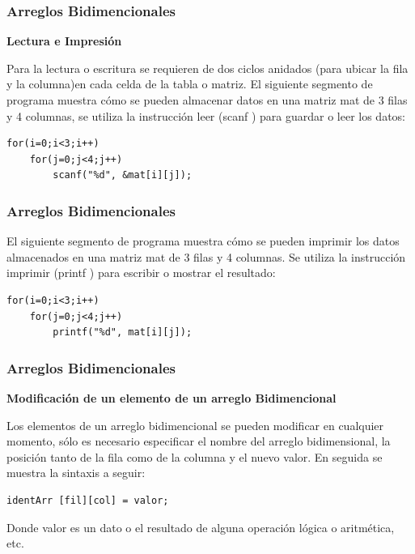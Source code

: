 \begin{frame}[t, fragile]
    \frametitle{Arreglos Bidimencionales}
    \begin{center}\textbf{Lectura e Impresión}\end{center}
    \justify
    \hspace{5mm}Para la lectura o escritura se requieren de dos ciclos anidados (para ubicar la fila y la columna)en cada celda de la tabla o matriz.
    El siguiente segmento de programa muestra cómo se pueden almacenar datos en una matriz mat de 3
    filas y 4 columnas, se utiliza la instrucción leer (scanf ) para guardar o leer los datos:
    \begin{lstlisting}
for(i=0;i<3;i++)
    for(j=0;j<4;j++)
        scanf("%d", &mat[i][j]);
    \end{lstlisting}
\end{frame}

\begin{frame}[fragile]
    \frametitle{Arreglos Bidimencionales}
    El siguiente segmento de programa muestra cómo se pueden imprimir los datos almacenados en una
    matriz mat de 3 filas y 4 columnas. Se utiliza la instrucción imprimir (printf ) para escribir o mostrar el resultado:
    \begin{lstlisting}
for(i=0;i<3;i++)
    for(j=0;j<4;j++)
        printf("%d", mat[i][j]);
    \end{lstlisting}
\end{frame}

\begin{frame}[fragile]
    \frametitle{Arreglos Bidimencionales}
    \begin{center}
        \textbf{Modificación de un elemento de un arreglo Bidimencional}
    \end{center}
    Los elementos de un arreglo bidimencional se pueden modificar en cualquier momento, sólo es necesario especificar el nombre del arreglo bidimensional, la posición tanto de la fila como de la columna y el nuevo valor. En seguida se muestra la sintaxis a seguir:
    \begin{lstlisting}
identArr [fil][col] = valor;
    \end{lstlisting}
    Donde valor es un dato o el resultado de alguna operación lógica o aritmética, etc.
    \begin{lstlisting}

    \end{lstlisting}
\end{frame}